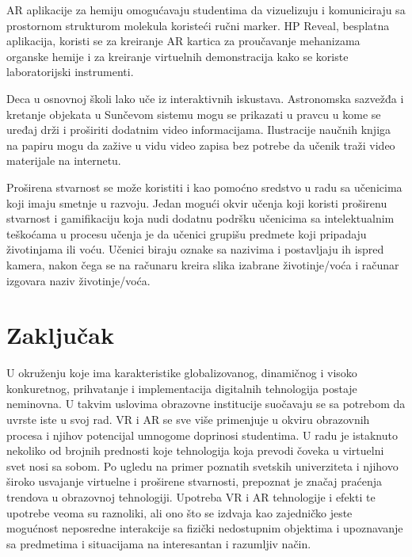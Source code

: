 \documentclass[a4paper]{article}
\begin{document}
	AR aplikacije za hemiju omogućavaju studentima da vizuelizuju i komuniciraju sa prostornom strukturom molekula koristeći ručni marker. HP Reveal, besplatna aplikacija, koristi 
	se za kreiranje AR kartica za proučavanje mehanizama organske hemije i za kreiranje virtuelnih demonstracija kako se koriste laboratorijski instrumenti.

	Deca u osnovnoj školi lako uče iz interaktivnih iskustava. Astronomska sazvežđa i kretanje objekata u Sunčevom sistemu mogu se prikazati u pravcu u kome se uređaj drži
	i proširiti dodatnim video informacijama. Ilustracije naučnih knjiga na papiru mogu da zažive u vidu video zapisa bez potrebe da učenik traži video materijale na internetu.

	Proširena stvarnost se može koristiti i kao pomoćno sredstvo u radu sa učenicima koji imaju smetnje u razvoju. Jedan mogući okvir učenja koji koristi proširenu stvarnost 
	i gamifikaciju koja nudi dodatnu podršku učenicima sa intelektualnim teškoćama u procesu učenja je da učenici grupišu predmete koji pripadaju životinjama ili voću. 
	Učenici biraju oznake sa nazivima i postavljaju ih ispred kamera, nakon čega se na računaru kreira slika izabrane životinje/voća i računar izgovara naziv životinje/voća.


	\section{Zaključak}
	\label{sec:Zaključak}
	U okruženju koje ima karakteristike globalizovanog, dinamičnog i visoko  konkuretnog, prihvatanje i implementacija digitalnih 
	tehnologija postaje neminovna. U takvim uslovima obrazovne institucije suočavaju se sa potrebom da uvrste iste u svoj rad. VR i AR se sve više primenjuje
	u okviru obrazovnih procesa i njihov potencijal umnogome doprinosi studentima. U radu je istaknuto nekoliko od brojnih prednosti koje tehnologija koja prevodi
	čoveka u virtuelni svet nosi sa sobom. Po ugledu na primer poznatih svetskih univerziteta i njihovo široko usvajanje virtuelne i proširene stvarnosti, prepoznat 
	je značaj praćenja trendova u obrazovnoj tehnologiji. Upotreba VR i AR tehnologije i efekti te upotrebe veoma su raznoliki, ali ono što se izdvaja kao zajedničko 
	jeste mogućnost neposredne interakcije sa fizički nedostupnim objektima i upoznavanje sa predmetima i situacijama na interesantan i razumljiv način.
\end{document}

